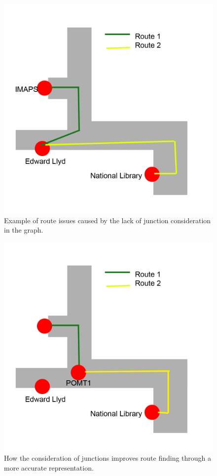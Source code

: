 \begin{figure}[H]
\includegraphics[scale=0.5]{Chapter2/beforepomt.png} 
\caption[Route Before Junction]{Example of route issues caused by the lack of junction consideration in the graph.}
\end{figure}
\begin{figure}[H]
\includegraphics[scale=0.5]{Chapter2/pomt.png} 
\caption[Route after Junction]{How the consideration of junctions improves route finding through a more accurate representation.}
\end{figure}

